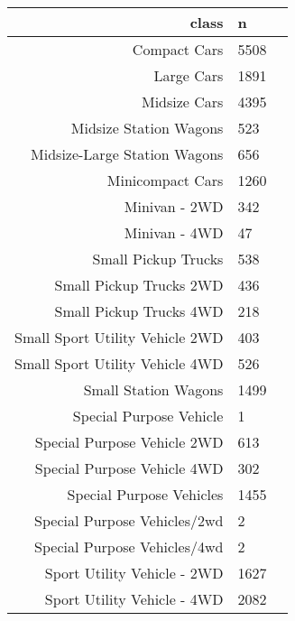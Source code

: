 \documentclass[11pt]{article}
\begin{document}
    \begin{tabular}{r|ll}
 class & n\\
\hline
	 Compact Cars                       & 5508                              \\
	 Large Cars                         & 1891                              \\
	 Midsize Cars                       & 4395                              \\
	 Midsize Station Wagons             &  523                              \\
	 Midsize-Large Station Wagons       &  656                              \\
	 Minicompact Cars                   & 1260                              \\
	 Minivan - 2WD                      &  342                              \\
	 Minivan - 4WD                      &   47                              \\
	 Small Pickup Trucks                &  538                              \\
	 Small Pickup Trucks 2WD            &  436                              \\
	 Small Pickup Trucks 4WD            &  218                              \\
	 Small Sport Utility Vehicle 2WD    &  403                              \\
	 Small Sport Utility Vehicle 4WD    &  526                              \\
	 Small Station Wagons               & 1499                              \\
	 Special Purpose Vehicle            &    1                              \\
	 Special Purpose Vehicle 2WD        &  613                              \\
	 Special Purpose Vehicle 4WD        &  302                              \\
	 Special Purpose Vehicles           & 1455                              \\
	 Special Purpose Vehicles/2wd       &    2                              \\
	 Special Purpose Vehicles/4wd       &    2                              \\
	 Sport Utility Vehicle - 2WD        & 1627                              \\
	 Sport Utility Vehicle - 4WD        & 2082                              \\

\end{tabular}
\end{document}
